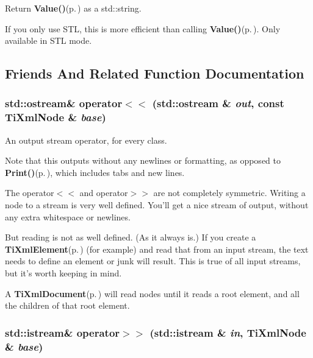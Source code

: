 Return {\bf Value()}{\rm (p.\,\pageref{classTiXmlNode_TiXmlUnknowna7})} as a std::string. 

If you only use STL, this is more efficient than calling {\bf Value()}{\rm (p.\,\pageref{classTiXmlNode_TiXmlUnknowna7})}. Only available in STL mode.

\subsection{Friends And Related Function Documentation}
\subsubsection{\setlength{\rightskip}{0pt plus 5cm}std::ostream\& operator$<$$<$ (std::ostream \& {\em out}, const {\bf Ti\-Xml\-Node} \& {\em base})\hspace{0.3cm}{\tt  [friend, inherited]}}\label{classTiXmlNode_TiXmlUnknownn1}


An output stream operator, for every class. 

Note that this outputs without any newlines or formatting, as opposed to {\bf Print()}{\rm (p.\,\pageref{classTiXmlBase_TiXmlNodea73})}, which includes tabs and new lines.

The operator$<$$<$ and operator$>$$>$ are not completely symmetric. Writing a node to a stream is very well defined. You'll get a nice stream of output, without any extra whitespace or newlines.

But reading is not as well defined. (As it always is.) If you create a {\bf Ti\-Xml\-Element}{\rm (p.\,\pageref{classTiXmlElement})} (for example) and read that from an input stream, the text needs to define an element or junk will result. This is true of all input streams, but it's worth keeping in mind.

A {\bf Ti\-Xml\-Document}{\rm (p.\,\pageref{classTiXmlDocument})} will read nodes until it reads a root element, and all the children of that root element.
\subsubsection{\setlength{\rightskip}{0pt plus 5cm}std::istream\& operator$>$$>$ (std::istream \& {\em in}, {\bf Ti\-Xml\-Node} \& {\em base})\hspace{0.3cm}{\tt  [friend, inherited]}}\label{classTiXmlNode_TiXmlUnknownn0}



